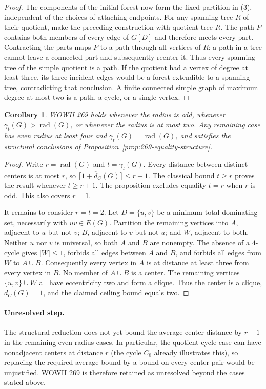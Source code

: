 \documentclass[11pt,a4paper]{article}
\newtheorem{corollary}[theorem]{Corollary}
\theoremstyle{remark}
\begin{document}
\begin{proof}
The components of the initial forest now form the fixed partition
in (3), independent of the choices of attaching endpoints. For any
spanning tree $R$ of their quotient, make the preceding construction
with quotient tree $R$. The path $P$ contains both members of every
edge of $G[D]$ and therefore meets every part. Contracting the parts
maps $P$ to a path through all vertices of $R$: a path in a tree
cannot leave a connected part and subsequently reenter it.
Thus every spanning tree of the simple quotient is a path. If the
quotient had a vertex of degree at least three, its three incident
edges would be a forest extendible to a spanning tree, contradicting
that conclusion. A finite connected simple graph of maximum degree
at most two is a path, a cycle, or a single vertex.
\end{proof}

\begin{corollary}\label{cor:269-partial}
WOWII 269 holds whenever the radius is odd, whenever
$\gamma_t(G)>\operatorname{rad}(G)$, or whenever the radius is at
most two. Any remaining case has even radius at least four and
$\gamma_t(G)=\operatorname{rad}(G)$, and satisfies the structural
conclusions of Proposition~\ref{prop:269-equality-structure}.
\end{corollary}
\begin{proof}
Write $r=\operatorname{rad}(G)$ and $t=\gamma_t(G)$. Every
distance between distinct centers is at most $r$, so
$\lceil1+\overline d_C(G)\rceil\le r+1$. The classical bound
$t\ge r$ proves the result whenever $t\ge r+1$. The proposition
excludes equality $t=r$ when $r$ is odd. This also covers $r=1$.

It remains to consider $r=t=2$. Let $D=\{u,v\}$ be a minimum
total dominating set, necessarily with $uv\in E(G)$. Partition
the remaining vertices into $A$, adjacent to $u$ but not $v$;
$B$, adjacent to $v$ but not $u$; and $W$, adjacent to both.
Neither $u$ nor $v$ is universal, so both $A$ and $B$ are
nonempty. The absence of a $4$-cycle gives $|W|\le1$, forbids
all edges between $A$ and $B$, and forbids all edges from $W$
to $A\cup B$. Consequently every vertex in $A$ is at distance
at least three from every vertex in $B$. No member of $A\cup B$
is a center. The remaining vertices $\{u,v\}\cup W$ all have
eccentricity two and form a clique. Thus the center is a clique,
$\overline d_C(G)=1$, and the claimed ceiling bound equals two.
\end{proof}

\paragraph{Unresolved step.}
The structural reduction does not yet bound the average center
distance by $r-1$ in the remaining even-radius cases. In particular,
the quotient-cycle case can have nonadjacent centers at distance
$r$ (the cycle $C_8$ already illustrates this), so replacing the
required average bound by a bound on every center pair would be
unjustified. WOWII 269 is therefore retained as unresolved beyond
the cases stated above.
\end{document}
